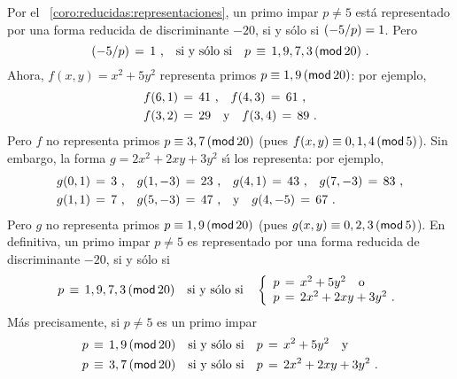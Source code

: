 \begin{ejemGeneros}
	Por el \coroname~\ref{coro:reducidas:representaciones},
	un primo impar $p\neq 5$ est\'a representado por una
	forma reducida de discriminante $-20$, si y s\'olo si
	$\tlegendre{-5} p=1$. Pero
	\begin{displaymath}
		\tlegendre{-5} p\,=\,1\dispcomma\dispiff
		p\,\equiv\,1,9,7,3\tmodulo[20]
		\dispstop
	\end{displaymath}
	Ahora, $f(x,y)=x^2+5y^2$ representa primos
	$p\equiv 1,9\tmodulo[20]$: por ejemplo,
	\begin{displaymath}
		\begin{aligned}
			f(6,1) & \,=\,41\dispcomma\quad
				f(4,3)\,=\,61 \dispcomma \\
			f(3,2) & \,=\,29\dispand f(3,4)\,=\,89
			\dispstop
		\end{aligned}
	\end{displaymath}
	Pero $f$ no representa primos $p\equiv 3,7\tmodulo[20]$
	(pues $f(x,y)\equiv 0,1,4\tmodulo[5]$).
	Sin embargo, la forma $g=2x^2+2xy+3y^2$ s\'{\i} los
	representa: por ejemplo,
	\begin{displaymath}
		\begin{aligned}
			g(0,1) & \,=\,3\dispcomma\quad
				g(1,-3)\,=\,23\dispcomma\quad
				g(4,1)\,=\,43\dispcomma\quad
				g(7,-3)\,=\,83\dispcomma \\
			g(1,1) & \,=\,7\dispcomma\quad
				g(5,-3)\,=\,47\dispcomma\dispand
				g(4,-5)\,=\,67
				\dispstop
		\end{aligned}
	\end{displaymath}
	Pero $g$ no representa primos $p\equiv 1,9\tmodulo[20]$
	(pues $g(x,y)\equiv 0,2,3\tmodulo[5]$).
	En definitiva, un primo impar $p\neq 5$ es representado
	por una forma reducida de discriminante $-20$, si y s\'olo si
	\begin{displaymath}
		p\,\equiv\,1,9,7,3\tmodulo[20]
		\dispiff
		\left\{
			\begin{array}{l}
				p\,=\,x^2+5y^2\dispor \\
				p\,=\,2x^2+2xy+3y^2
				\dispstop
			\end{array}
		\right.
	\end{displaymath}
	M\'as precisamente, si $p\neq 5$ es un primo impar 
	\begin{displaymath}
		\begin{aligned}
			p & \,\equiv\,1,9\tmodulo[20]\dispiff
				p\,=\,x^2+5y^2\dispand \\
			p & \,\equiv\,3,7\tmodulo[20]\dispiff
				p\,=\,2x^2+2xy+3y^2
			\dispstop
		\end{aligned}
	\end{displaymath}
\end{ejemGeneros}

